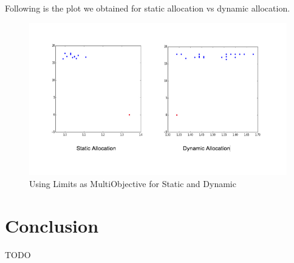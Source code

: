 \documentclass[twoside,10pt]{article}
\begin{document}
Following is the plot we obtained for static allocation vs  dynamic allocation. \\

\begin{figure}[h]
\begin{center}
\includegraphics[width=4.in]{svd.png}
\caption{Using Limits as MultiObjective for Static and Dynamic}
\end{center}
\end{figure}
\newpage
\section{Conclusion}
TODO
%
%
\end{document}
